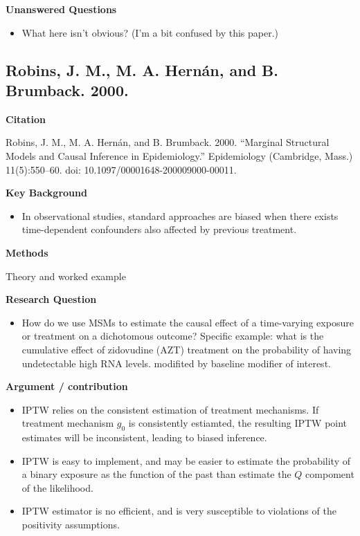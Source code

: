 \documentclass[
]{book}
\providecommand{\tightlist}{%
  \setlength{\itemsep}{0pt}\setlength{\parskip}{0pt}}
\begin{document}
\textbf{Unanswered Questions}

\begin{itemize}
\tightlist
\item
  What here isn't obvious? (I'm a bit confused by this paper.)
\end{itemize}

\hypertarget{robins-j.-m.-m.-a.-hernuxe1n-and-b.-brumback.-2000.}{%
\subsection*{Robins, J. M., M. A. Hernán, and B. Brumback. 2000.}\label{robins-j.-m.-m.-a.-hernuxe1n-and-b.-brumback.-2000.}}

\textbf{Citation}

Robins, J. M., M. A. Hernán, and B. Brumback. 2000. ``Marginal Structural Models and Causal Inference in Epidemiology.'' Epidemiology (Cambridge, Mass.) 11(5):550--60. doi: 10.1097/00001648-200009000-00011.

\textbf{Key Background}

\begin{itemize}
\tightlist
\item
  In observational studies, standard approaches are biased when there exists time-dependent confounders also affected by previous treatment.
\end{itemize}

\textbf{Methods}

Theory and worked example

\textbf{Research Question}

\begin{itemize}
\tightlist
\item
  How do we use MSMs to estimate the causal effect of a time-varying exposure or treatment on a dichotomous outcome? Specific example: what is the cumulative effect of zidovudine (AZT) treatment on the probability of having undetectable high RNA levels. modifited by baseline modifier of interest.
\end{itemize}

\textbf{Argument / contribution}

\begin{itemize}
\tightlist
\item
  IPTW relies on the consistent estimation of treatment mechanisms. If treatment mechanism \(g_0\) is consistently estiamted, the resulting IPTW point estimates will be inconsistent, leading to biased inference.
\item
  IPTW is easy to implement, and may be easier to estimate the probability of a binary exposure as the function of the past than estimate the \(Q\) compoment of the likelihood.
\item
  IPTW estimator is no efficient, and is very susceptible to violations of the positivity assumptions.
\end{itemize}
\end{document}

